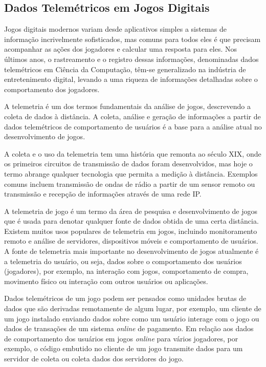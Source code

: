 \subsection{Dados Telemétricos em Jogos Digitais}
Jogos digitais modernos variam desde aplicativos simples a sistemas de informação incrivelmente sofisticados, mas comuns para todos eles é que precisam acompanhar as ações dos jogadores e calcular uma resposta para eles. Nos últimos anos, o rastreamento e o registro dessas informações, denominadas dados telemétricos em Ciência da Computação, têm-se generalizado na indústria de entretenimento digital, levando a uma riqueza de informações detalhadas sobre o comportamento dos jogadores.

A telemetria é um dos termos fundamentais da análise de jogos, descrevendo a coleta de dados à distância. A coleta, análise e geração de informações a partir de dados telemétricos de comportamento de usuários é a base para a análise atual no desenvolvimento de jogos.

A coleta e o uso da telemetria tem uma história que remonta ao século XIX, onde os primeiros circuitos de transmissão de dados foram desenvolvidos, mas hoje o termo abrange qualquer tecnologia que permita a medição à distância. Exemplos comuns incluem transmissão de ondas de rádio a partir de um sensor remoto ou transmissão e recepção de informações através de uma rede IP.

A telemetria de jogo é um termo da área de pesquisa e desenvolvimento de jogos que é usada para denotar qualquer fonte de dados obtida de uma certa distância. Existem muitos usos populares de telemetria em jogos, incluindo monitoramento remoto e análise de servidores, dispositivos móveis e comportamento de usuários. A fonte de telemetria mais importante no desenvolvimento de jogos atualmente é a telemetria do usuário, ou seja, dados sobre o comportamento dos usuários (jogadores), por exemplo, na interação com jogos, comportamento de compra, movimento físico ou interação com outros usuários ou aplicações.

Dados telemétricos de um jogo podem ser pensados como unidades brutas de dados que são derivadas remotamente de algum lugar, por exemplo, um cliente de um jogo instalado enviando dados sobre como um usuário interage com o jogo ou dados de transações de um sistema \textit{online} de pagamento. Em relação aos dados de comportamento dos usuários em jogos \textit{online} para vários jogadores, por exemplo, o código embutido no cliente de um jogo transmite dados para um servidor de coleta ou coleta dados dos servidores do jogo.

